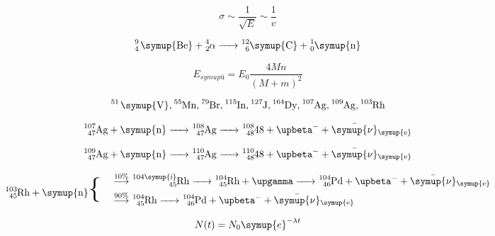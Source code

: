 \begin{equation}
   \sigma \sim \frac{1}{\sqrt{E}} \sim \frac{1}{v} \nonumber
\end{equation}

\begin{equation}
   \ce{ ^9_4 \symup{Be} + ^4_2$\alpha$ -> ^{12}_6\symup{C} + ^1_0\symup{n}} \nonumber
\end{equation}

\begin{equation}
   E_{symup{ü}}  = E_0 \frac{4Mn}{\left( M + m \right)^2} \nonumber
\end{equation}

\begin{equation}
   \ce{^{51} \symup{V}, ^{55}\text{Mn}, ^{79}\text{Br}, ^{115}\text{In}, ^{127}\text{J}, ^{164}\text{Dy}, ^{107}{Ag}, ^{109}\text{Ag}, ^{103}\text{Rh}} \nonumber
\end{equation}

\begin{equation}
   \ce{^{107}_{47}\text{Ag} + \symup{n} -> ^{108}_{47}\text{Ag} -> ^{108}_{48}\text{48} + $\upbeta$^- + \bar{\symup{\nu}}_{\symup{e}}} \nonumber
\end{equation}

\begin{equation}
   \ce{^{109}_{47}\text{Ag} + \symup{n} -> ^{110}_{47}\text{Ag} -> ^{110}_{48}\text{48} + $\upbeta$^- + \bar{\symup{\nu}}_{\symup{e}}} \nonumber
\end{equation}

\begin{equation}
   \begin{split}
      \ce{^{103}_{45}\text{Rh} + \symup{n}} \mathbin{\scalebox{2.5} \textbraceleft } \quad \nonumber
   \end{split}
   \begin{split}
      &\overset{10\%}{\longrightarrow} \ce{^{104\symup{i}}_{45}\text{Rh} -> ^{104}_{45}\text{Rh} + $\upgamma$ -> ^{104}_{46}\text{Pd} + $\upbeta$^- + \bar{\symup{\nu}}_{\symup{e}} } \nonumber\\
      &\overset{90\%}{\longrightarrow} \ce{^{104}_{45}\text{Rh} -> ^{104}_{46}\text{Pd} + $\upbeta$^- +\bar{\symup{\nu}}_{\symup{e}} } \nonumber\\
   \end{split}
\end{equation}

\begin{equation}
   N(t) = N_0 \symup{e}^{- \lambda t} \nonumber
\end{equation}

